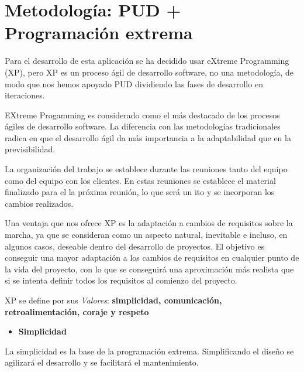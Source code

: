 \documentclass[12 pt, a4paper, twoside]{article}
\begin{document}






\section{Metodología: PUD + Programación extrema}
Para el desarrollo de esta aplicación se ha decidido usar eXtreme
Programming (XP), pero XP es un proceso ágil de desarrollo
software, no una metodología, de modo que nos hemos apoyado PUD
dividiendo las fases de desarrollo en iteraciones.

EXtreme Progamming es considerado como el más destacado de los
procesos ágiles de desarrollo software. La diferencia con las
metodologías tradicionales radica en que el desarrollo ágil da más
importancia a la adaptabilidad que en la previsibilidad.

La organización del trabajo se establece durante las reuniones tanto
del equipo como del equipo con los clientes. En estas reuniones se
establece el material finalizado para el la próxima reunión, lo que
será un ito y se incorporan los cambios realizados.

Una ventaja que nos ofrece XP es la adaptación a cambios de requisitos
sobre la marcha, ya que se consideran como un aspecto natural,
inevitable e incluso, en algunos casos, deseable dentro del desarrollo
de proyectos. El objetivo es conseguir una mayor adaptación a los
cambios de requisitos en cualquier punto de la vida del proyecto, con
lo que se conseguirá una aproximación más realista que si se intenta
definir todos los requisitos al comienzo del proyecto.

XP se define por sus \emph{Valores}: \textbf{simplicidad,
comunicación, retroalimentación, coraje y respeto}
\begin{itemize}
\item \textbf{Simplicidad}
\end{itemize}
La simplicidad es la base de la programación extrema. Simplificando el
diseño se agilizará el desarrollo y se facilitará el mantenimiento.
\end{document}
